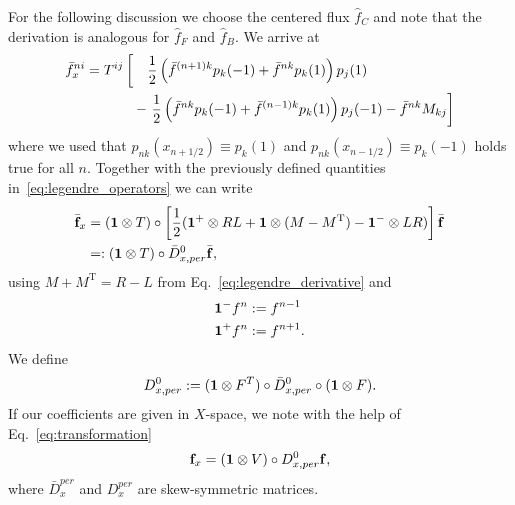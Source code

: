 For the following discussion we choose the centered flux $\hat f_C$ and note
that the derivation is analogous for $\hat f_F$ and $\hat f_B$.
We arrive at
\begin{align}
    \bar f_x^{ni}= T^{ij}&\left[ \quad \frac{1}{2} \left(\bar f^{(n+1)k}p_k(-1)+ \bar f^{nk}p_k(1)\right)p_j(1)\right. \nonumber\\
        &\ \ - \left.\frac{1}{2} \left(\bar f^{nk}p_k(-1) + \bar f^{(n-1)k}p_k(1)\right)p_j(-1) - \bar f^{nk} M_{kj} \vphantom{\frac{1}{2}}\right]
    \label{}
\end{align}
where we used that $p_{nk}(x_{n+1/2})\equiv p_k(1)$ and $p_{nk}(x_{n-1/2}) \equiv p_k(-1)$ holds true for all $n$.
Together with the previously defined quantities in~\eqref{eq:legendre_operators} we can write
\begin{align}
	\bar{\mathbf f}_x  &= (\mathbf{1}\otimes T)\circ \left[ \frac{1}{2}(\mathbf{1}^+\otimes RL + \mathbf{1} \otimes (M-M^{\mathrm{T}}) - \mathbf{1}^-\otimes LR)\right] \bar{\mathbf f}\nonumber \\
    &=: (\mathbf{1}\otimes T) \circ \bar D^0_{x,per} \bar {\mathbf f},
    \label{eq:discrete_der}
\end{align}
using $M+M^{\mathrm{T}} = R-L$ from Eq.~\eqref{eq:legendre_derivative}
and 
\begin{align}
    \mathbf{1}^{-}f^{n} &:= f^{n-1}\\
    \mathbf{1}^{+}f^{n} &:= f^{n+1}.
    \label{eq:operator_one}
\end{align}
We define
\begin{align*}
    D^0_{x,per} := (\mathbf{1}\otimes F^T)\circ \bar D^0_{x,per}\circ (\mathbf{1}\otimes F).
    \label{}
\end{align*}
If our coefficients are given in $X$-space, we note with the help of Eq.~\eqref{eq:transformation}
\begin{align}
	\mathbf f_x %
 = (\Eins\otimes V)\circ D^0_{x,per} \mathbf f,
    \label{eq:matrix_xspace}
\end{align}
where $\bar D_x^{per}$ and $D_x^{per}$ are skew-symmetric matrices.

